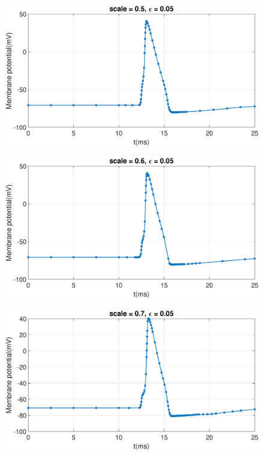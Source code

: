 \documentclass[12pt,a4paper]{article}
\begin{document}
\begin{CJK}{UTF8}{bsmi}
\begin{figure}[htbp]
	\end{figure}
	\begin{figure}[htbp]
		\centering
		\includegraphics[width = 500pt]{505.eps}
	\end{figure}
	\begin{figure}[htbp]
		\centering
		\includegraphics[width = 500pt]{605.eps}
	\end{figure}
	\begin{figure}[htbp]
		\centering
		\includegraphics[width = 500pt]{705.eps}

\end{figure}
\end{CJK}
\end{document}
